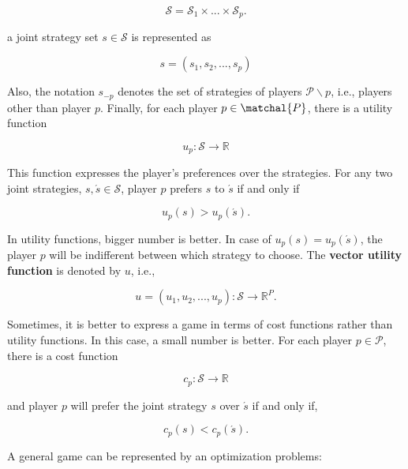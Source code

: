 \begin{equation*}
\mathcal{S} = \mathcal{S}_1 \times ... \times \mathcal{S}_p.
\end{equation*}

a joint strategy set $s \in \mathcal{S}$ is represented as 

\begin{equation*}
s = (s_1,s_2,...,s_p)
\end{equation*}

Also, the notation $s_{-p}$ denotes the set of strategies of players $\mathcal{P} \backslash p$, i.e., players other than player $p$. Finally, for each player $p \in \matchal{P}$, there is a utility function 

\begin{equation*}
u_p : \mathcal{S} \to \mathbb{R}
\end{equation*}

This function expresses the player's preferences over the strategies. For any two joint strategies, $s, \acute{s} \in \mathcal{S}$, player $p$ prefers $s$ to $\acute{s}$ if and only if

\begin{equation*}
 u_p(s) > u_p(\acute{s}).
\end{equation*}

In utility functions, bigger number is better. In case of $u_p(s) = u_p(\acute{s})$, the player $p$ will be indifferent between which strategy to choose. The \textbf{vector utility function} is denoted by $u$, i.e.,

\begin{equation*}
u = (u_1, u_2, ..., u_p) : \mathcal{S} \to \mathbb{R}^P.
\end{equation*}

Sometimes, it is better to express a game in terms of cost functions rather than utility functions. In this case, a small number is better. For each player $p \in \mathcal{P}$, there is a cost function 

\begin{equation*}
c_p : \mathcal{S} \to \mathbb{R}
\end{equation*}

and player $p$ will prefer the joint strategy $s$ over $\acute{s}$ if and only if, 

\begin{equation*}
c_p(s) < c_p(\acute{s}).
\end{equation*}

A general game can be represented by an optimization problems: 

